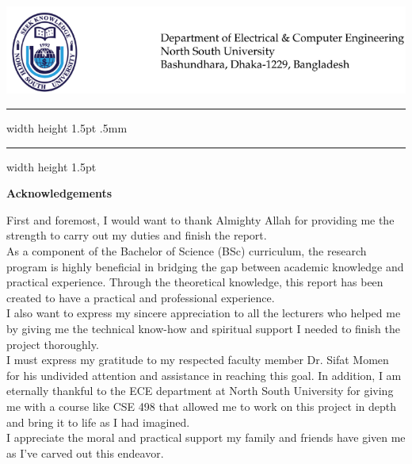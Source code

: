 \chapter*{}
\vspace*{-5cm}


{\centering \includegraphics[width=\linewidth, scale=1]{02_Approval/letterhead.png}}
{\hrule width \hsize height 1.5pt \kern .5mm \hrule width \hsize height 1.5pt}

\vspace*{2ex}
\begin{center}
\textbf{\Large Acknowledgements}
\end{center}

\par First and foremost, I would want to thank Almighty Allah for providing me the strength to carry out my duties and finish the report.\\
As a component of the Bachelor of Science (BSc) curriculum, the research program is highly beneficial in bridging the gap between academic knowledge and practical experience. Through the theoretical knowledge, this report has been created to have a practical and professional experience.\\
I also want to express my sincere appreciation to all the lecturers who helped me by giving me the technical know-how and spiritual support I needed to finish the project thoroughly.\\
I must express my gratitude to my respected faculty member Dr. Sifat Momen for his undivided attention and assistance in reaching this goal. In addition, I am eternally thankful to the ECE department at North South University for giving me with a course like CSE 498 that allowed me to work on this project in depth and bring it to life as I had imagined.\\
I appreciate the moral and practical support my family and friends have given me as I've carved out this endeavor.\\


\let\cleardoublepage\clearpage